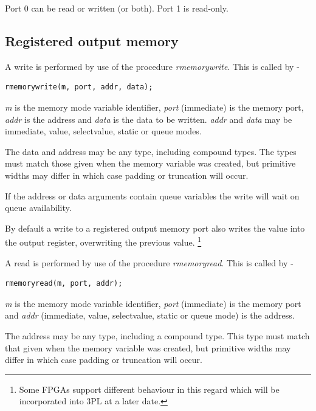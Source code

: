                 Port 0 can be read or written (or both). Port 1 is read-only.


        \subsection{Registered output memory}

            A write is performed by use of the procedure {\em rmemorywrite}.
            This is called by -
            \begin{lstlisting}[gobble=12, language=threepl]
                   rmemorywrite(m, port, addr, data);
            \end{lstlisting}
            {\em m} is the memory mode variable identifier, {\em port}
            (immediate) is the memory port, {\em addr} is the address and
            {\em data} is the data to be written. {\em addr} and {\em data}
            may be immediate, value, selectvalue, static or queue modes.

            The data and address may be any type, including compound types.
            The types must match those given when the memory variable
            was created, but primitive widths may differ in which case
            padding or truncation will occur.
            
            If the address or data arguments contain queue variables the write
            will wait on queue availability.
            
            By default a write to a registered output memory port also
            writes the value into the output register, overwriting the
            previous value. \footnote{Some FPGAs support different behaviour
            in this regard which will be incorporated into 3PL at a later date.}

            A read is performed by use of the procedure {\em rmemoryread}. This
            is called by -
            \begin{lstlisting}[gobble=12, language=threepl]
                   rmemoryread(m, port, addr);
            \end{lstlisting}
            {\em m} is the memory mode variable identifier, {\em port}
            (immediate) is the memory port and {\em addr} (immediate, value,
            selectvalue, static or queue mode) is the address.

            The address may be any type, including a compound type.
            This type must match that given when the memory variable
            was created, but primitive widths may differ in which case
            padding or truncation will occur.
            
